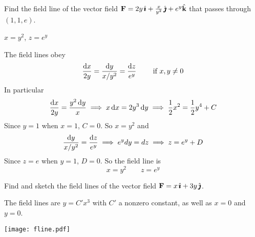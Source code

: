\begin{question}[M317 2003A] %
Find the field line of the vector field
$\mathbf{F}= 2y\,\hat{\pmb{\imath}}+ \frac{x}{y^2}\,\hat{\pmb{\jmath}}+e^y\hat{\mathbf{k}}$ that passes through
$(1,1,e)$.
\end{question}


\begin{answer} 
$x=y^2$, $z=e^y$
\end{answer}

\begin{solution} 
The field lines obey
\begin{equation*}
\frac{\mathrm{d}x}{2y}=\frac{\mathrm{d}y}{x/y^2}=\frac{\mathrm{d}z}{e^y}
\qquad\text{ if $x,y\ne 0$}
\end{equation*}
In particular
\begin{align*}
\frac{\mathrm{d}x}{2y}=\frac{y^2\,\mathrm{d}y}{x}
\implies
x\,\mathrm{d}x=2y^3\,\mathrm{d}y
\implies
\frac{1}{2}x^2=\frac{1}{2}y^4+C
\end{align*}
Since $y=1$ when $x=1$, $C=0$. So $x=y^2$ and
\begin{equation*}
\frac{\mathrm{d}y}{x/y^2}=\frac{\mathrm{d}z}{e^y}
\implies
e^ydy=dz
\implies
z=e^y+D
\end{equation*}
Since $z=e$ when $y=1$, $D=0$. So the field line is
\begin{equation*}
x=y^2 \qquad z=e^y
\end{equation*}
\end{solution}

\begin{question}[M317 2001A] %
 Find and sketch the field lines of the vector field
$\mathbf{F}= x\,\hat{\pmb{\imath}}+ 3y\,\hat{\pmb{\jmath}}$.
\end{question}


\begin{answer}
The field lines are $y=C'x^3$ with $C'$ a nonzero constant,
as well as $x=0$ and $y=0$.

\begin{center}
   \texttt{[image: fline.pdf]}
\end{center}

\end{answer}

